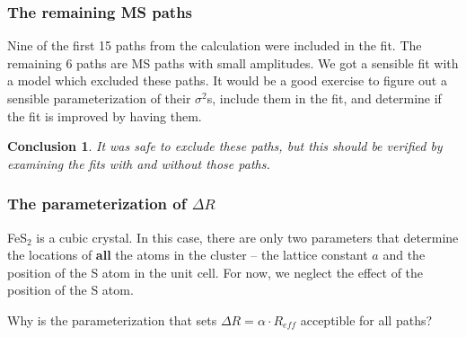 \documentclass[10pt, xcolor=x11names, compress, handout]{beamer}
\newcommand{\fes}{FeS$_2$}
\newtheorem{conclusion}[theorem]{Conclusion}
\begin{document}
\begin{frame}
  \frametitle{The remaining MS paths}
  Nine of the first 15 paths from the {\feff} calculation were
  included in the fit.  The remaining 6 paths are MS paths with small
  amplitudes.  We got a sensible fit with a model which excluded these
  paths.  It would be a good exercise to figure out a sensible
  parameterization of their $\sigma^2$s, include them in the fit, and
  determine if the fit is improved by having them.

  \begin{conclusion}
    It was safe to exclude these paths, but this should be verified by
    examining the fits with and without those paths.
  \end{conclusion}
\end{frame}

\begin{frame}
  \frametitle{The parameterization of $\Delta R$}
  \footnotesize%
  {\fes} is a cubic crystal.  In this case, there are only two
  parameters that determine the locations of \textbf{all} the atoms in
  the cluster -- the lattice constant $a$ and the position of the S
  atom in the unit cell.  For now, we neglect the effect of  the
  position of the S atom.

  \medskip

  Why is the parameterization that sets $\Delta R=\alpha\cdot R_{eff}$
  acceptible for all paths?


\end{frame}
\end{document}
